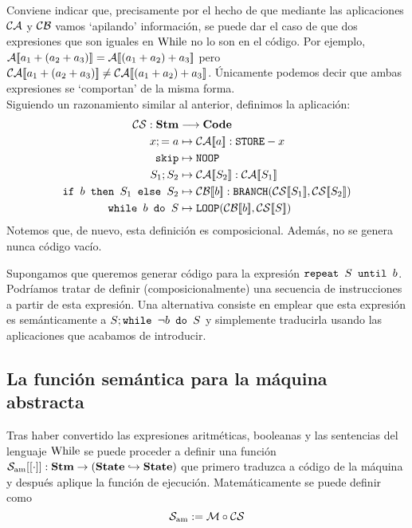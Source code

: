 Conviene indicar que, precisamente por el hecho de que mediante las aplicaciones $\mathcal{CA}$ y $\mathcal{CB}$ vamos `apilando' información, se puede dar el caso de que dos expresiones que son iguales en $\mathrm{While}$ no lo son en el código. Por ejemplo, $\mathcal{A}[\![a_1+(a_2 + a_3)]\!]= \mathcal{A}[\![(a_1+a_2)+a_3]\!]$ pero $\mathcal{CA}[\![a_1+(a_2 + a_3)]\!]\neq \mathcal{CA}[\![(a_1+a_2)+a_3]\!]$. Únicamente podemos decir que ambas expresiones se `comportan' de la misma forma.
\\

Siguiendo un razonamiento similar al anterior, definimos la aplicación:
\begin{align*}
    \mc{CS}: \mathbf{Stm} &\longrightarrow\mathbf{Code}\\
    x;=a &\mapsto \fc{CA}{a}:\n{STORE}-x\\
    \n{skip} &\mapsto \n{NOOP}\\
    S_1;S_2&\mapsto \fc{CA}{S_2}:\fc{CA}{S_1}\\
    \n{if }b\n{ then } S_1 \n{ else }S_2&\mapsto \fc{CB}{b}:\n{BRANCH}(\fc{CS}{S_1}, \fc{CS}{S_2})\\
    \n{while }b\n{ do }S&\mapsto \n{LOOP}(\fc{CB}{b}, \fc{CS}{S})
\end{align*}
Notemos que, de nuevo, esta definición es composicional. Además, no se genera nunca código vacío. 

\begin{example}
Supongamos que queremos generar código para la expresión $\texttt{repeat }S \texttt{ until }b$. Podríamos tratar de definir (composicionalmente) una secuencia de instrucciones a partir de esta expresión. Una alternativa consiste en emplear que esta expresión es semánticamente a $S; \texttt{while }\neg b \texttt{ do }S$ y simplemente traducirla usando las aplicaciones que acabamos de introducir.
\end{example}

\subsection{La función semántica para la máquina abstracta}
Tras haber convertido las expresiones aritméticas, booleanas y las sentencias del lenguaje $\mathrm{While}$ se puede proceder a definir una función $\mathcal{S}_{\mathrm{am}}[[\cdot]]: \textbf{Stm}\to (\textbf{State} \hookrightarrow \textbf{State})$ que primero traduzca a código de la máquina y después aplique la función de ejecución. Matemáticamente se puede definir como
\[
    \mathcal{S}_{\mathrm{am}} := \mathcal{M}\circ \mathcal{CS}
\]

